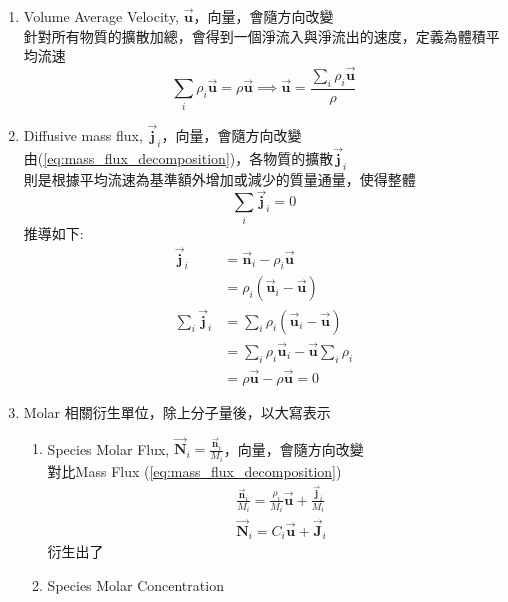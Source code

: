 \documentclass[../main.tex]{subfiles}
\begin{document}
\begin{itemize}
\begin{enumerate}
      $\vec{\bm j}_i$即為分子擴散所造成的
      \item Volume Average Velocity, $\vec{\bm u}$，向量，會隨方向改變\\
        針對所有物質的擴散加總，會得到一個淨流入與淨流出的速度，定義為體積平均流速
        \begin{equation}
          \sum_i \rho_i \vec{\bm u} = \rho \vec{\bm u} \implies \boxed{\vec{\bm u} = \frac{\sum_i \rho_i \vec{\bm u}}{\rho}}
        \end{equation}
      \item Diffusive mass flux, $\vec{\bm j}_i$，向量，會隨方向改變\\
        由(\ref{eq:mass_flux_decomposition})，各物質的擴散$\vec{\bm j}_i$\\
        則是根據平均流速為基準額外增加或減少的質量通量，使得整體
        \begin{equation}
          \boxed{\sum_i \vec{\bm j}_i = 0}
        \end{equation}
        推導如下:
        \begin{align}
          \vec{\bm j}_i &= \vec{\bm n}_i - \rho_i \vec{\bm u} \nonumber\\
          &= \rho_i (\vec{\bm u}_i - \vec{\bm u})\nonumber\\
          \sum_i \vec{\bm j}_i &= \sum_i \rho_i (\vec{\bm u}_i - \vec{\bm u})\nonumber\\
          &= \sum_i \rho_i \vec{\bm u}_i - \vec{\bm u} \sum_i \rho_i \nonumber\\
          &= \rho \vec{\bm u} - \rho \vec{\bm u} = 0
        \end{align}
      \item Molar 相關衍生單位，除上分子量後，以大寫表示
      \begin{enumerate}
        \item Species Molar Flux, $\vec{\bm N}_i = \frac{\vec{\bm n}_i}{M_i}$，向量，會隨方向改變\\
          對比Mass Flux (\ref{eq:mass_flux_decomposition})
          \begin{align}
            &\boxed{\frac{\vec{\bm n}_i}{M_i}} = \boxed{\frac{\rho_i }{M_i}}\vec{\bm u} + \boxed{\frac{\vec{\bm j}_i}{M_i}} \nonumber\\
            &\boxed{\vec{\bm N}_i = C_i \vec{\bm u} + \vec{\bm J}_i} \label{eq:molar_flux_decomposition}
          \end{align}
          衍生出了
        \item Species Molar Concentration

\end{enumerate}
\end{enumerate}
\end{itemize}
\end{document}
